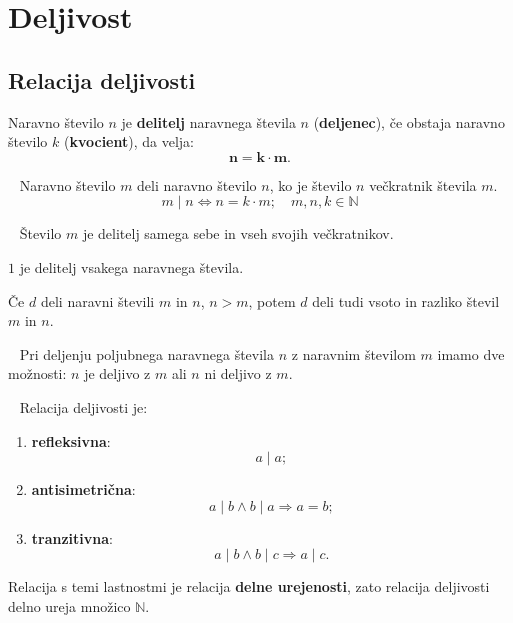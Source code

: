 \chapter{Deljivost}


    \section{Relacija deljivosti}

        
            
                Naravno število $n$ je \textbf{delitelj} naravnega števila $n$ (\textbf{deljenec}), če obstaja naravno število $k$ (\textbf{kvocient}), da velja: $$\mathbf{n=k\cdot m}.$$
            
                ~\newline
                Naravno število $m$ deli naravno število $n$, ko je število $n$ večkratnik števila $m$. $$m\mid n \Leftrightarrow n=k\cdot m;\quad m,n,k\in\mathbb{N}$$
            
                ~\newline
                Število $m$ je delitelj samega sebe in vseh svojih večkratnikov.
            
                $1$ je delitelj vsakega naravnega števila.
                ~\newline

                Če $d$ deli naravni števili $m$ in $n$, $n>m$, potem $d$ deli tudi vsoto in razliko števil $m$ in $n$.
            
                ~\newline
                Pri deljenju poljubnega naravnega števila $n$ z naravnim številom $m$ imamo dve možnosti: $n$ je deljivo z $m$ ali $n$ ni deljivo z $m$.
        
                ~\newline
                Relacija deljivosti je:
                \begin{enumerate}
                    \item \textbf{refleksivna}: $$a\mid a;$$
                    \item \textbf{antisimetrična}: $$a\mid b \wedge b\mid a \Rightarrow a=b;$$
                    \item \textbf{tranzitivna}:  $$a\mid b \wedge b\mid c \Rightarrow a\mid c.$$
                \end{enumerate}
            
                Relacija s temi lastnostmi je relacija \textbf{delne urejenosti}, zato relacija deljivosti delno ureja množico $\mathbb{N}$.
            

